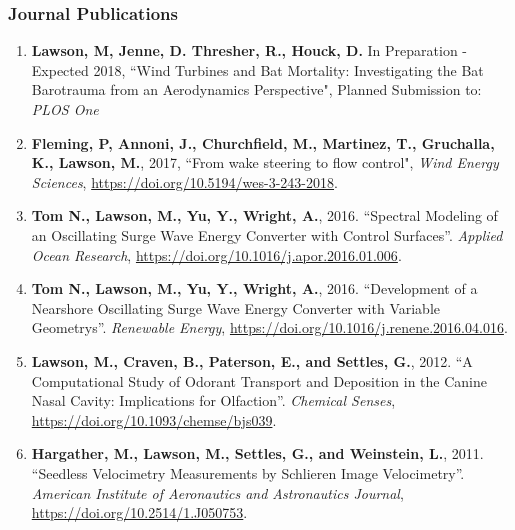 \subsubsection*{\large{Journal Publications}}
\vspace{-0.15in}

\begin{enumerate}[leftmargin=1.5pc,itemsep=0pt,parsep=0pt,topsep=0pt,partopsep=1pt]

\item \textbf{Lawson, M, Jenne, D. Thresher, R., Houck, D.} In Preparation - Expected 2018, ``Wind Turbines and Bat Mortality: Investigating the Bat Barotrauma from an Aerodynamics Perspective", Planned Submission to: \emph{PLOS One}

\item \textbf{Fleming, P, Annoni, J., Churchfield, M., Martinez, T., Gruchalla, K., Lawson, M.}, 2017, ``From wake steering to flow control", \emph{Wind Energy Sciences}, \href{https://doi.org/10.5194/wes-3-243-2018}{https://doi.org/10.5194/wes-3-243-2018}.

\item \textbf{Tom N., Lawson, M., Yu, Y., Wright, A.}, 2016. ``Spectral Modeling of an Oscillating Surge Wave Energy Converter with Control Surfaces''. \emph{Applied Ocean Research}, \href{https://doi.org/10.1016/j.apor.2016.01.006}{https://doi.org/10.1016/j.apor.2016.01.006}.

\item \textbf{Tom N., Lawson, M., Yu, Y., Wright, A.}, 2016. ``Development of a Nearshore Oscillating Surge Wave Energy Converter with Variable Geometrys''. \emph{Renewable Energy}, \href{https://doi.org/10.1016/j.renene.2016.04.016}{https://doi.org/10.1016/j.renene.2016.04.016}.

\item \textbf{Lawson, M., Craven, B., Paterson, E., and Settles, G.}, 2012. ``A Computational Study of Odorant Transport and Deposition in the Canine Nasal Cavity: Implications for Olfaction''. \emph{Chemical Senses}, \href{https://doi.org/10.1093/chemse/bjs039}{https://doi.org/10.1093/chemse/bjs039}.

\item \textbf{Hargather, M., Lawson, M., Settles, G., and Weinstein, L.}, 2011. ``Seedless Velocimetry Measurements by Schlieren Image Velocimetry''. \emph{American Institute of Aeronautics and Astronautics Journal}, \href{https://doi.org/10.2514/1.J050753}{https://doi.org/10.2514/1.J050753}.


\end{enumerate}

